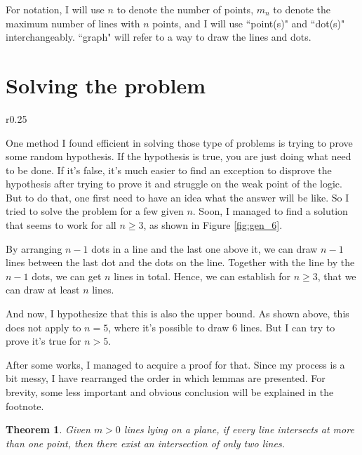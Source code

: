 \documentclass[a4paper, 12pt]{article}
\newtheorem{theorem}{Theorem}[section]
\begin{document}
For notation, I will use $n$ to denote the number of points, $m_n$ to denote the maximum number of lines with $n$ points, and I will use ``point(s)" and ``dot(s)" interchangeably. ``graph" will refer to a way to draw the lines and dots.
\clearpage

\section{Solving the problem}
\begin{wrapfigure}{r}{0.25\textwidth}
    
    \caption{general solution with $n=6$}
    \label{fig:gen_6}
\end{wrapfigure}
One method I found efficient in solving those type of problems is trying to prove some random hypothesis. If the hypothesis is true, you are just doing what need to be done. If it's false, it's much easier to find an exception to disprove the hypothesis after trying to prove it and struggle on the weak point of the logic. But to do that, one first need to have an idea what the answer will be like. So I tried to solve the problem for a few given $n$. Soon, I managed to find a solution that seems to work for all $n\geq 3$, as shown in Figure \ref{fig:gen_6}.

By arranging $n-1$ dots in a line and the last one above it, we can draw $n-1$ lines between the last dot and the dots on the line. Together with the line by the $n-1$ dots, we can get $n$ lines in total. Hence, we can establish for $n\geq 3$, that we can draw at least $n$ lines.

And now, I hypothesize that this is also the upper bound. As shown above, this does not apply to $n=5$, where it's possible to draw 6 lines. But I can try to prove it's true for $n>5$.

After some works, I managed to acquire a proof for that. Since my process is a bit messy, I have rearranged the order in which lemmas are presented. For brevity, some less important and obvious conclusion will be explained in the footnote.

\begin{theorem}
Given $m>0$ lines lying on a plane, if every line intersects at more than one point, then there exist an intersection of only two lines.
\end{theorem}
\end{document}
